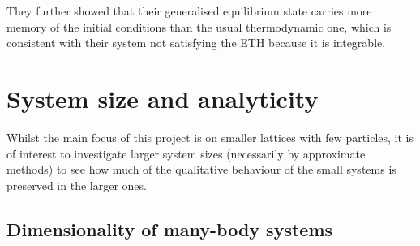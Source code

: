 \documentclass[a4paper, 10pt]{article}
\theoremstyle{plain}
\begin{document}
They further showed that their generalised equilibrium state carries more memory
of the initial conditions than the usual thermodynamic one, which is consistent
with their system not satisfying the ETH because it is integrable.


\section{System size and analyticity}

Whilst the main focus of this project is on smaller lattices with few particles,
it is of interest to investigate larger system sizes (necessarily by approximate
methods) to see how much of the qualitative behaviour of the small systems is
preserved in the larger ones.

\subsection{Dimensionality of many-body systems}
\end{document}
